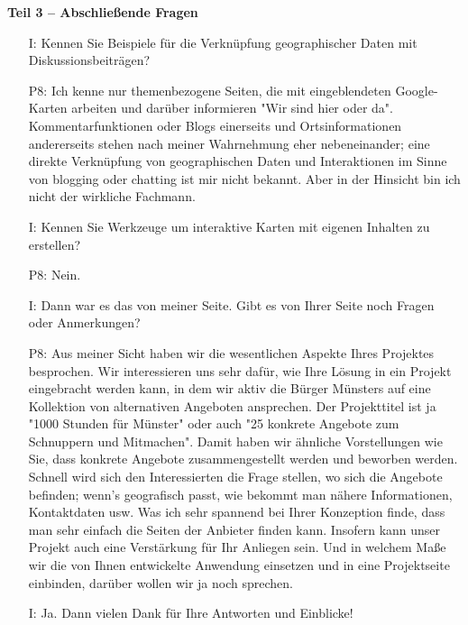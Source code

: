 \textbf{Teil 3 -- Abschlie{\ss}ende Fragen}
\begin{itemize}
    \item[I:] Kennen Sie Beispiele f{\"u}r die Verkn{\"u}pfung geographischer Daten mit Diskussionsbeitr{\"a}gen?
    \item[P8:] Ich kenne nur themenbezogene Seiten, die mit eingeblendeten Google-Karten arbeiten und dar{\"u}ber informieren "Wir sind hier oder da". Kommentarfunktionen oder Blogs einerseits und Ortsinformationen andererseits stehen nach meiner Wahrnehmung eher nebeneinander; eine direkte Verkn{\"u}pfung von geographischen Daten und Interaktionen im Sinne von blogging oder chatting ist mir nicht bekannt. Aber in der Hinsicht bin ich nicht der wirkliche Fachmann.
    \item[I:] Kennen Sie Werkzeuge um interaktive Karten mit eigenen Inhalten zu erstellen?
    \item[P8:] Nein.
    \item[I:] Dann war es das von meiner Seite. Gibt es von Ihrer Seite noch Fragen oder Anmerkungen?
    \item[P8:] Aus meiner Sicht haben wir die wesentlichen Aspekte Ihres Projektes besprochen. Wir interessieren uns sehr daf{\"u}r, wie Ihre L{\"o}sung in ein Projekt eingebracht werden kann, in dem wir aktiv die B{\"u}rger M{\"u}nsters auf eine Kollektion von alternativen Angeboten ansprechen. Der Projekttitel ist ja "1000 Stunden f{\"u}r M{\"u}nster" oder auch "25 konkrete Angebote zum Schnuppern und Mitmachen". Damit haben wir {\"a}hnliche Vorstellungen wie Sie, dass konkrete Angebote zusammengestellt werden und beworben werden. Schnell wird sich den Interessierten die Frage stellen, wo sich die Angebote befinden; wenn's geografisch passt, wie bekommt man n{\"a}here Informationen, Kontaktdaten usw. Was ich sehr spannend bei Ihrer Konzeption finde, dass man sehr einfach die Seiten der Anbieter finden kann. Insofern kann unser Projekt auch eine Verst{\"a}rkung f{\"u}r Ihr Anliegen sein. Und in welchem Ma{\ss}e wir die von Ihnen entwickelte Anwendung einsetzen und in eine Projektseite einbinden, dar{\"u}ber wollen wir ja noch sprechen.
    \item[I:] Ja. Dann vielen Dank f{\"u}r Ihre Antworten und Einblicke!
\end{itemize}